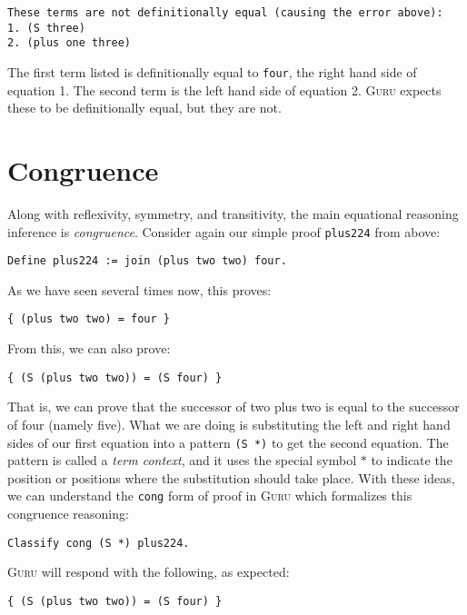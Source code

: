 \documentclass{book}[12pt]
\newcommand{\guru}[0]{\textsc{Guru}\xspace}
\begin{document}
\begin{verbatim}
These terms are not definitionally equal (causing the error above):
1. (S three)
2. (plus one three)
\end{verbatim}

\noindent The first term listed is definitionally equal to \texttt{four},
the right hand side of equation 1.  The second term is the left hand
side of equation 2.  \guru expects these to be definitionally equal,
but they are not.

\section{Congruence}

Along with reflexivity, symmetry, and transitivity, the main
equational reasoning inference is \emph{congruence}.  Consider again
our simple proof \texttt{plus224} from above:

\begin{verbatim}
Define plus224 := join (plus two two) four.
\end{verbatim}

\noindent As we have seen several times now, this proves:

\begin{verbatim}
{ (plus two two) = four }
\end{verbatim}

\noindent From this, we can also prove:

\begin{verbatim}
{ (S (plus two two)) = (S four) }
\end{verbatim}

\noindent That is, we can prove that the successor of two plus two is
equal to the successor of four (namely five).  What we are doing is
substituting the left and right hand sides of our first equation into
a pattern \texttt{(S *)} to get the second equation.  The pattern is
called a \emph{term context}, and it uses the special symbol $*$ to
indicate the position or positions where the substitution should take
place.  With these ideas, we can understand the \texttt{cong} form of
proof in \guru which formalizes this congruence reasoning:

\begin{verbatim}
Classify cong (S *) plus224.
\end{verbatim}

\noindent \guru will respond with the following, as expected:

\begin{verbatim}
{ (S (plus two two)) = (S four) }
\end{verbatim}
\end{document}
